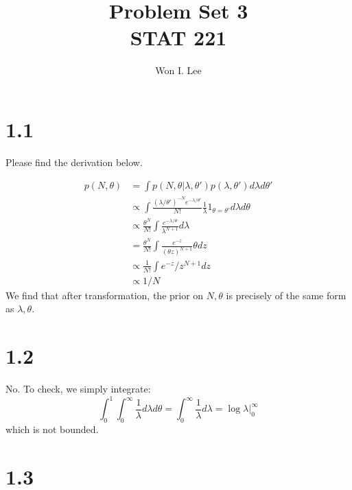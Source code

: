\documentclass[10pt,psamsfonts]{amsart}
\title{Problem Set 3 \\ STAT 221}
\author{Won I. Lee}
\theoremstyle{definition}
\theoremstyle{remark}
\numberwithin{equation}{section}
\begin{document}
	
\maketitle

\section*{1.1}

Please find the derivation below.

\begin{align*}
p(N,\theta) &= \int p(N,\theta|\lambda, \theta')p(\lambda, \theta')d\lambda d\theta'\\
&\propto \int \frac{(\lambda/\theta')^{-N}e^{-\lambda/\theta'}}{N!} \frac{1}{\lambda} 1_{\theta=\theta'}d\lambda d\theta\\
&\propto \frac{\theta^N}{N!}\int \frac{e^{-\lambda/\theta}}{\lambda^{N+1}}d\lambda\\
&= \frac{\theta^N}{N!} \int \frac{e^{-z}}{(\theta z)^{N+1}} \theta dz\\
&\propto \frac{1}{N!}\int e^{-z}/z^{N+1}dz\\
&\propto 1/N
\end{align*}
We find that after transformation, the prior on $N,\theta$ is precisely of the same form as $\lambda, \theta$. 

\section*{1.2}

No. To check, we simply integrate:
$$\int_0^1 \int_0^{\infty} \frac{1}{\lambda}d\lambda d\theta = \int_0^{\infty} \frac{1}{\lambda} d\lambda = \log \lambda |_{0}^{\infty}$$
which is not bounded.

\section*{1.3}
\end{document}
